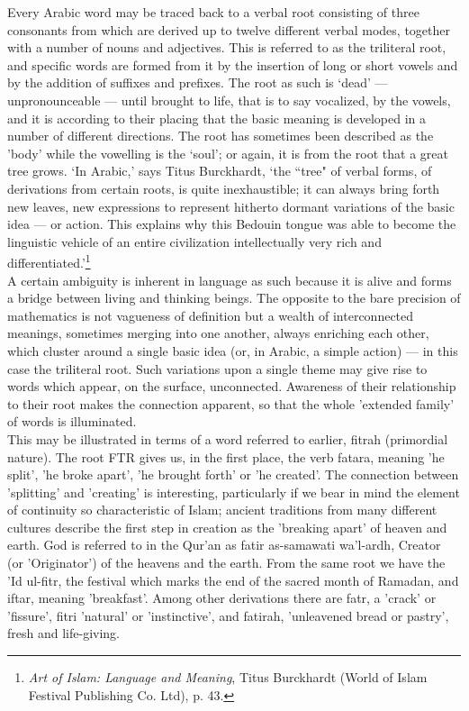 \documentclass[10pt, twoside,openright]{book}
\begin{document}
Every Arabic word may be traced back to a verbal root consisting of three consonants from which are 
derived up to twelve different verbal modes, together with a number of nouns and adjectives. This is 
referred to as the triliteral root, and specific words are formed from it by the insertion of long or 
short vowels and by the addition of suffixes and prefixes. The root as such is `dead' --- 
unpronounceable --- until brought to life, that is to say vocalized, by the vowels, and it is according 
to their placing that the basic meaning is developed in a number of different directions. The root 
has sometimes been described as the 'body' while the vowelling is the `soul'; or again, it is from 
the root that a great tree grows. `In Arabic,' says Titus Burckhardt, `the ``tree" of verbal forms, of 
derivations from certain roots, is quite inexhaustible; it can always bring forth new leaves, new 
expressions to represent hitherto dormant variations of the basic idea --- or action. This explains why 
this Bedouin tongue was able to become the linguistic vehicle of an entire civilization 
intellectually very rich and differentiated.'\footnote{\emph{Art of Islam: Language and Meaning}, Titus Burckhardt (World of Islam Festival Publishing Co. Ltd), p. 43.}\\

A certain ambiguity is inherent in language as such because it is alive and forms a bridge between 
living and thinking beings. The opposite to the bare precision of mathematics is not vagueness of 
definition but a wealth of interconnected meanings, sometimes merging into one another, always 
enriching each other, which cluster around a single basic idea (or, in Arabic, a simple action) --- in 
this case the triliteral root. Such variations upon a single theme may give rise to words which 
appear, on the surface, unconnected. Awareness of their relationship to their root makes the 
connection apparent, so that the whole 'extended family' of words is illuminated. \\

This may be illustrated in terms of a word referred to earlier, fitrah (primordial nature). The root 
FTR gives us, in the first place, the verb fatara, meaning 'he split', 'he broke apart', 'he brought 
forth' or 'he created'. The connection between 'splitting' and 'creating' is interesting, 
particularly if we bear in mind the element of continuity so characteristic of Islam; ancient 
traditions from many different cultures describe the first step in creation as the 'breaking apart' 
of heaven and earth. God is referred to in the Qur'an as fatir as\hyp{}samawati wa'l\hyp{}ardh, Creator (or 
'Originator') of the heavens and the earth. From the same root we have the 'Id ul\hyp{}fitr, the festival 
which marks the end of the sacred month of Ramadan, and iftar, meaning 'breakfast'. Among other 
derivations there are fatr, a 'crack' or 'fissure', fitri 'natural' or 'instinctive', and fatirah, 
'unleavened bread or pastry', fresh and life\hyp{}giving. \\
\end{document}
